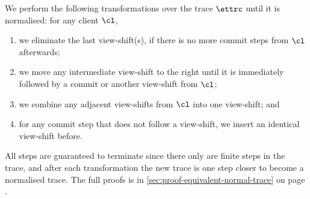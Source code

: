 \begin{proofsketch}
We perform the following transformations over the trace \( \ettrc \) until it is normalised:
for any client \( \cl \),
\begin{enumerate}
\item we eliminate the last view-shift(s), if there is no more commit steps from \( \cl \) afterwards;
\item we move any intermediate view-shift to the right until 
    it is immediately followed by a commit or another view-shift from \( \cl \);
\item we combine any adjacent view-shifts from \( \cl \) into one view-shift; and
\item for any commit step that does not follow a view-shift,
    we insert an identical view-shift before.
\end{enumerate}
All steps are guaranteed to terminate since there only are finite steps in the trace, 
and after each transformation the new trace is one step closer to become a normalised trace.
The full proofs is in \cref{sec:proof-equivalent-normal-trace} on page \pageref{sec:proof-equivalent-normal-trace}.
\end{proofsketch}

